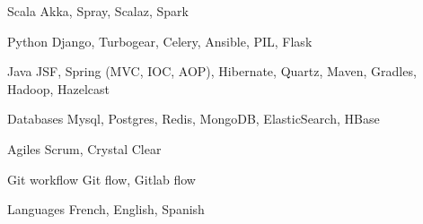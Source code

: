 

\begin{cvskills}

  \cvskill
    {Scala} %
    {Akka, Spray, Scalaz, Spark} %

  \cvskill
    {Python} %
    {Django, Turbogear, Celery, Ansible, PIL, Flask} %


  \cvskill
    {Java} %
    {JSF, Spring (MVC, IOC, AOP), Hibernate, Quartz, Maven, Gradles, Hadoop, Hazelcast} %

  \cvskill
    {Databases} %
    {Mysql, Postgres, Redis, MongoDB, ElasticSearch, HBase} %

  \cvskill
    {Agiles} %
    {Scrum, Crystal Clear} %

  \cvskill
    {Git workflow} %
    {Git flow, Gitlab flow} %

  \cvskill
    {Languages} %
    {French, English, Spanish} %

\end{cvskills}
